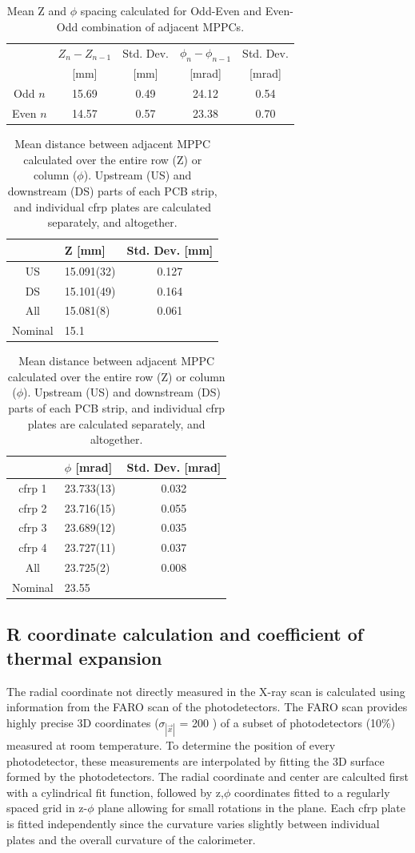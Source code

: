 \begin{table}
\begin{tabular}{ccccc}
 & $Z_{n} - Z_{n-1}$ &Std. Dev.& $\phi_{n} - \phi_{n-1}$ & Std. Dev. \\
 & [mm] &[mm]& [mrad]& [mrad]\\
\hline
Odd  $n$ & 15.69 & 0.49 & 24.12 & 0.54 \\ 
Even $n$ & 14.57 & 0.57 & 23.38 & 0.70 \\ 
\end{tabular}
\caption{Mean Z and $\phi$ spacing calculated for Odd-Even and Even-Odd
combination  of adjacent MPPCs.}
\label{tab:oddeven}
\end{table}

\begin{table}
\begin{tabular}{clc}
   & Z [mm] &Std. Dev. [mm] \\
\hline
US     & 15.091(32)& 0.127  \\
DS     & 15.101(49)& 0.164  \\
All    & 15.081(8) & 0.061  \\
Nominal& 15.1      &
\end{tabular}

\begin{tabular}{clc}
   & $\phi$ [mrad] &Std. Dev. [mrad] \\
\hline
cfrp 1     & 23.733(13)& 0.032  \\
cfrp 2     & 23.716(15)& 0.055  \\
cfrp 3     & 23.689(12)& 0.035  \\
cfrp 4     & 23.727(11)& 0.037  \\
All        & 23.725(2) & 0.008  \\
Nominal    & 23.55 &     
\end{tabular}
\label{tab:avgspacing}
\caption{Mean distance between adjacent MPPC calculated over the entire row (Z) or 
column ($\phi$). Upstream (US) and downstream (DS) parts of each PCB strip, and
individual cfrp plates are calculated separately, and altogether.}
\end{table}

\subsection {R coordinate calculation and 
coefficient of thermal expansion}
The radial coordinate not directly measured in the X-ray scan is
calculated using information from the FARO scan of the photodetectors.
The FARO scan provides highly precise 3D coordinates
($\sigma_{|\vec{x}|}$ = 200 \micron) of a subset of photodetectors
(10\%) measured at room temperature. To determine the position of
every photodetector, these measurements are interpolated by fitting
the 3D surface formed by the photodetectors. The radial coordinate and
center are calculted first with a cylindrical fit function, followed
by z,$\phi$ coordinates fitted to a regularly spaced grid in z-$\phi$
plane allowing for small rotations in the plane.  Each cfrp plate is
fitted independently since the curvature varies slightly between
individual plates and the overall curvature of the calorimeter.  



